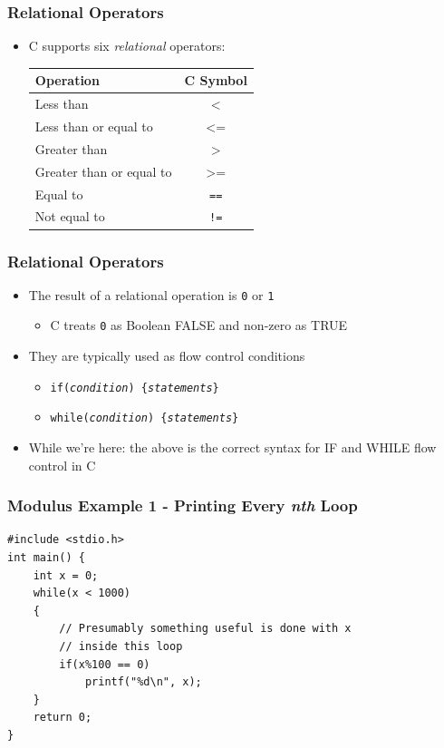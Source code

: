 \documentclass[14pt]{beamer}
\begin{document}
\begin{frame}
\frametitle{Relational Operators}
\begin{itemize}
\item C supports six \textit{relational} operators:
\begin{table}[H]
\centering
\begin{tabular}{|l|c|}
\hline
Operation      & C Symbol \\
\hline
Less than       & $\texttt{<}$        \\
Less than or equal to    & $\texttt{<=}$\\
Greater than & $\texttt{>}$        \\
Greater than or equal to       & $\texttt{>=}$       \\
Equal to & \texttt{==} \\
Not equal to & \texttt{!=} \\
\hline
\end{tabular}
\end{table}
\end{itemize}
\end{frame}

\begin{frame}
\frametitle{Relational Operators}
\begin{itemize}
\item The result of a relational operation is \texttt{0} or \texttt{1}
	\begin{itemize}
		\item C treats \texttt{0} as Boolean FALSE and non-zero as TRUE
	\end{itemize}
\item They are typically used as flow control conditions
	\begin{itemize}
		\item \texttt{if(\textit{condition}) \{\textit{statements}\}}
		\item \texttt{while(\textit{condition}) \{\textit{statements}\}}
	\end{itemize}
\item While we're here: the above is the correct syntax for IF and WHILE flow control in C
\end{itemize}
\end{frame}

\begin{frame}[fragile]
\frametitle{Modulus Example 1 - Printing Every \textit{nth} Loop}
\begin{lstlisting}[style=CStyle]
#include <stdio.h>
int main() {
	int x = 0;
	while(x < 1000)
	{
		// Presumably something useful is done with x
		// inside this loop
		if(x%100 == 0)
			printf("%d\n", x);
	}
	return 0;
}
\end{lstlisting}
\end{frame}
\end{document}
